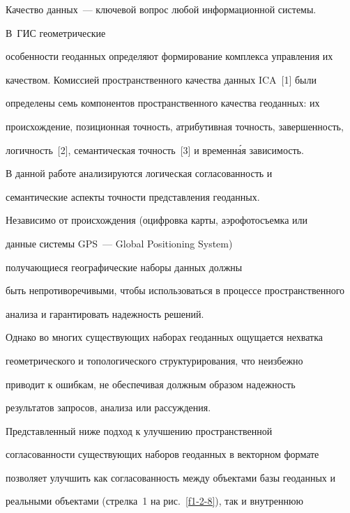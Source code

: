     Качество данных~--- ключевой вопрос любой информационной системы. 


В~ГИС геометрические 


особенности геоданных определяют формирование комплекса управления их 


качеством. Комиссией пространственного качества данных ICA~[1] были 


определены семь компонентов пространственного качества геоданных: их 


происхождение, позиционная точность, атрибутивная точность, завершенность, 


логичность~[2], семантическая точность~[3] и временн\'{а}я зависимость. 


    


    В данной работе анализируются логическая согласованность и 


семантические аспекты точности представления геоданных. 


    


    Независимо от происхождения (оцифровка карты, аэрофотосъемка или 


данные системы GPS~--- Global Positioning System) 


получающиеся географические наборы данных должны 


быть непротиворечивыми, чтобы использоваться в процессе пространственного 


анализа и гарантировать надежность решений. 


% 


    Однако во многих существующих наборах геоданных ощущается нехватка 


геометрического и топологического структурирования, что неизбежно 


приводит к ошибкам, не обеспечивая должным образом надежность 


результатов запросов, анализа или рассуждения. 


    


    Представленный ниже подход к улучшению пространственной 


со\-гла\-со\-ван\-ности существующих наборов геоданных в векторном формате 


позволяет улучшить как согласованность между объектами базы геоданных и 


реальными объектами (стрелка~1 на рис.~\ref{f1-2-8}), так и внутреннюю 


